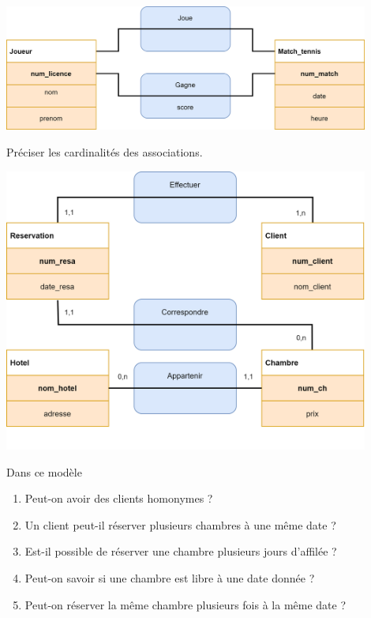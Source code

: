 \documentclass[10pt,cours,a4paper,firamath]{nsi}
\begin{document}
\begin{exercice}[]
    \begin{center}
        \includegraphics[width=12cm]{img/ex2}
    \end{center}
    Préciser les cardinalités des associations.
\end{exercice}
\newpage

\begin{exercice}[]
    \begin{center}
        \includegraphics[width=12cm]{img/ex_hotel}
    \end{center}
    Dans ce modèle
    \begin{enumerate}
        \item 	Peut-on avoir des clients homonymes ?
        \item 	Un client peut-il réserver plusieurs chambres à une même date ?
        \item 	Est-il possible de réserver une chambre plusieurs jours d'affilée ?
        \item 	Peut-on savoir si une chambre est libre à une date donnée ?
        \item 	Peut-on réserver la même chambre plusieurs fois à la même date ?
    \end{enumerate}
\end{exercice}
\end{document}
